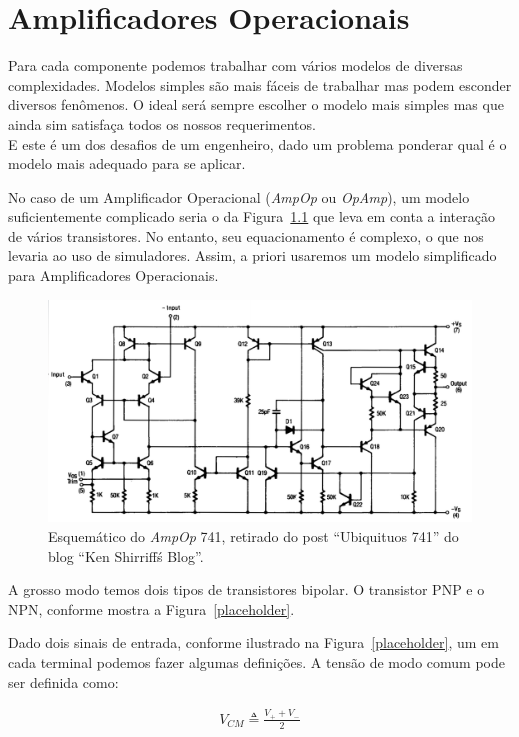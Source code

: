 \chapter{Amplificadores Operacionais}

Para cada componente podemos trabalhar com vários modelos de diversas complexidades. 
Modelos simples são mais fáceis de trabalhar mas podem esconder diversos fenômenos. 
O ideal será sempre escolher o modelo mais simples mas que ainda sim satisfaça todos os nossos requerimentos.\\
E este é um dos desafios de um engenheiro, dado um problema ponderar qual é 
o modelo mais adequado para se aplicar.

No caso de um Amplificador Operacional (\emph{AmpOp} ou \emph{OpAmp}), um modelo suficientemente
complicado seria o da Figura~\ref{fig:741schematic} que leva em conta a interação de vários transistores.
No entanto, seu equacionamento é complexo, o que nos levaria ao uso de simuladores. Assim, a priori usaremos um 
modelo simplificado para Amplificadores Operacionais.

\begin{figure}[htpb]
  \centering
  \includegraphics[width=0.8\linewidth]{./Assets/Images/Circuits/AmpOp/741schematic}
  \caption{Esquemático do \emph{AmpOp} 741, retirado do post ``Ubiquituos 741'' do blog ``Ken Shirriff\'s Blog''.}
  \label{fig:741schematic}
\end{figure}

A grosso modo temos dois tipos de transistores bipolar. O transistor PNP e o NPN, conforme mostra a Figura~\ref{placeholder}.


Dado dois sinais de entrada, conforme ilustrado na Figura~\ref{placeholder}, um em cada terminal podemos fazer algumas definições. A tensão de modo comum pode ser definida 
como:

\begin{align}
  V_{CM}  \triangleq \frac{V_{+}+V_{-}}{2} 
\end{align}

